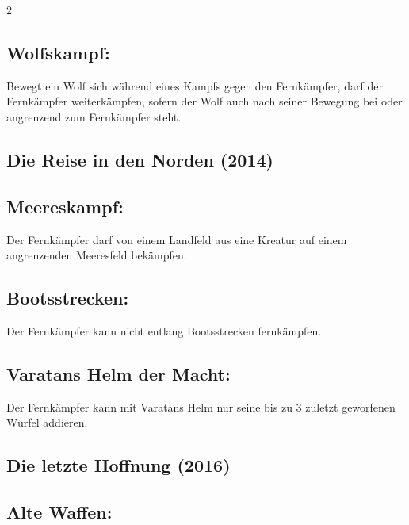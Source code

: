 \documentclass[10pt, a4paper, oneside]{book}
\begin{document}
\begin{multicols*}{2}
\begin{bgcolor}
\subsection{Wolfskampf:}

Bewegt ein Wolf sich während eines Kampfs gegen den Fernkämpfer, darf der Fernkämpfer weiterkämpfen, sofern der Wolf auch nach seiner Bewegung bei oder angrenzend zum Fernkämpfer steht.
\supercite{StSch:Begleitheft}




\end{bgcolor}


\begin{bgcolor}
\section{Die Reise in den Norden (2014)}


\subsection{Meereskampf:}

Der Fernkämpfer darf von einem Landfeld aus eine Kreatur auf einem angrenzenden Meeresfeld bekämpfen.
\supercite{DRidN:Begleitheft}


\subsection{Bootsstrecken:}

Der Fernkämpfer kann nicht entlang Bootsstrecken fernkämpfen.
\supercite{DRidN:FAQ}


\subsection{Varatans Helm der Macht:}

Der Fernkämpfer kann mit Varatans Helm nur seine bis zu 3 zuletzt geworfenen Würfel addieren.
\supercite{DRidN:Begleitheft}

\end{bgcolor}


\begin{bgcolor}
\section{Die letzte Hoffnung (2016)}


\subsection{Alte Waffen:}


\end{bgcolor}
\end{multicols*}
\end{document}
